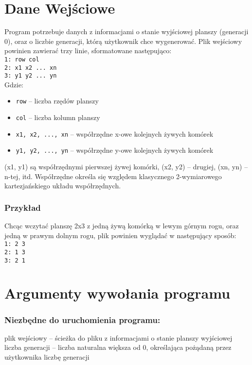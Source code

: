 \documentclass[11pt,a4paper]{report}
\begin{document}
\section{Dane Wejściowe}\label{sec:teskt}
Program potrzebuje danych z informacjami o stanie wyjściowej planszy (generacji 0),
oraz o liczbie generacji, którą użytkownik chce wygenerować.
Plik wejściowy powinien zawierać trzy linie, sformatowane następująco:\\
\texttt {1: row col}\\
\texttt {2: x1 x2 ... xn}\\
\texttt {3: y1 y2 ... yn}\\
Gdzie:
\begin {itemize}
\item \texttt {row} -- liczba rzędów planszy
\item \texttt {col} -- liczba kolumn planszy
\item \texttt{x1, x2, ..., xn} -- współrzędne x-owe kolejnych żywych komórek
\item \texttt{y1, y2, ..., yn} -- współrzędne y-owe kolejnych żywych komórek
\end {itemize}
(x1, y1) są współrzędnymi pierwszej żywej komórki, (x2, y2) -- drugiej, (xn, yn) -- n-tej, itd.
Współrzędne określa się względem klasycznego 2-wymiarowego kartezjańskiego układu współrzędnych.
\subsubsection {Przykład}
Chcąc wczytać planszę 2x3 z jedną żywą komórką w lewym górnym rogu, oraz jedną w prawym dolnym rogu,
plik powinien wyglądać w następujący sposób: \\
\texttt {1: 2 3} \\
\texttt {2: 1 3} \\
\texttt {3: 2 1} 
\newpage

\section{Argumenty wywołania programu}\label{sec:teskt}
\subsubsection {Niezbędne do uruchomienia programu:}
plik wejściowy -- ścieżka do pliku z informacjami o stanie planszy wyjściowej\\
liczba generacji -- liczba naturalna większa od 0, określająca pożądaną przez użytkownika liczbę generacji\\
\end{document}
